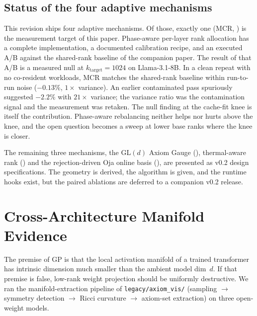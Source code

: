 \documentclass[11pt]{article}
\begin{document}
\subsection{Status of the four adaptive mechanisms}
This revision ships four adaptive mechanisms. Of those, exactly one
(MCR, ) is the measurement target of this paper.
Phase-aware per-layer rank allocation has a complete implementation, a
documented calibration recipe, and an executed A/B against the
shared-rank baseline of the companion paper. The result of that A/B is
a measured null at $k_\text{target}{=}1024$ on Llama-3.1-8B. In a clean
repeat with no co-resident workloads, MCR matches the shared-rank
baseline within run-to-run noise ($-0.13\%$, $1{\times}$ variance). An
earlier contaminated pass spuriously suggested $-2.2\%$ with $21{\times}$
variance; the variance ratio was the contamination signal and the
measurement was retaken. The null finding at the cache-fit knee is
itself the contribution. Phase-aware rebalancing neither helps nor
hurts above the knee, and the open question becomes a sweep at lower
base ranks where the knee is closer.

The remaining three mechanisms, the GL$(d)$ Axiom Gauge
(), thermal-aware rank () and the
rejection-driven Oja online basis (), are presented as
v0.2 design specifications. The geometry is derived, the algorithm is
given, and the runtime hooks exist, but the paired ablations are
deferred to a companion v0.2 release.

\section{Cross-Architecture Manifold Evidence}
\label{sec:manifold}



\noindent The premise of GP is that the local activation manifold of a trained
transformer has intrinsic dimension much smaller than the ambient model
dim~$d$.  If that premise is false, low-rank weight projection should be
uniformly destructive.  We ran the manifold-extraction pipeline of
\texttt{legacy/axiom\_vis/} (sampling $\to$ symmetry detection $\to$ Ricci
curvature $\to$ axiom-set extraction) on three open-weight models.
\end{document}
